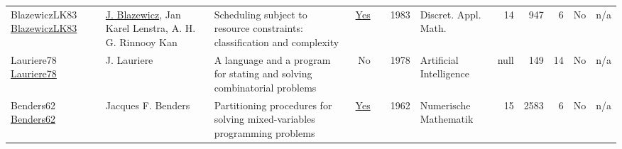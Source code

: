 {\begin{longtable}{>{\raggedright\arraybackslash}p{3cm}>{\raggedright\arraybackslash}p{6cm}>{\raggedright\arraybackslash}p{6.5cm}rrrp{2.5cm}rrrrr}
BlazewiczLK83 \href{https://doi.org/10.1016/0166-218X(83)90012-4}{BlazewiczLK83} & \hyperref[auth:a775]{J. Blazewicz}, Jan Karel Lenstra, A. H. G. Rinnooy Kan & Scheduling subject to resource constraints: classification and complexity & \href{../works/BlazewiczLK83.pdf}{Yes} & \cite{BlazewiczLK83} & 1983 & Discret. Appl. Math. & 14 & 947 & 6 & No & n/a\\
Lauriere78 \href{http://dx.doi.org/10.1016/0004-3702(78)90029-2}{Lauriere78} & J. Lauriere & A language and a program for stating and solving combinatorial problems & No & \cite{Lauriere78} & 1978 & Artificial Intelligence & null & 149 & 14 & No & n/a\\
Benders62 \href{http://dx.doi.org/10.1007/bf01386316}{Benders62} & Jacques F. Benders & Partitioning procedures for solving mixed-variables programming problems & \href{../works/Benders62.pdf}{Yes} & \cite{Benders62} & 1962 & Numerische Mathematik & 15 & 2583 & 6 & No & n/a\\
\end{longtable}
}


